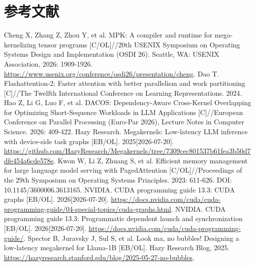 \section*{参考文献}
{\sloppy\small\linespread{1.35}\selectfont
\begin{list}{}{\setlength{\leftmargin}{2em}\setlength{\itemindent}{-2em}\setlength{\itemsep}{3pt}\setlength{\parsep}{0pt}}
 Cheng X, Zhang Z, Zhou Y, et al. MPK: A compiler and runtime for mega-kernelizing tensor programs [C/OL]//20th USENIX Symposium on Operating Systems Design and Implementation (OSDI 26). Seattle, WA: USENIX Association, 2026: 1909-1926. \url{https://www.usenix.org/conference/osdi26/presentation/cheng}.
 Dao T. Flashattention-2: Faster attention with better parallelism and work partitioning [C]//The Twelfth International Conference on Learning Representations. 2024.
 Hao Z, Li G, Luo F, et al. DACOS: Dependency-Aware Cross-Kernel Overlapping for Optimizing Short-Sequence Workloads in LLM Applications [C]//European Conference on Parallel Processing (Euro-Par 2026), Lecture Notes in Computer Science. 2026: 409-422.
 Hazy Research. Megakernels: Low-latency LLM inference with device-side task graphs [EB/OL]. 2025[2026-07-20]. \url{https://github.com/HazyResearch/Megakernels/tree/7309cec801537b61fea3b50d7dfe454a6cde578e}.
 Kwon W, Li Z, Zhuang S, et al. Efficient memory management for large language model serving with PagedAttention [C/OL]//Proceedings of the 29th Symposium on Operating Systems Principles. 2023: 611-626. DOI: 10.1145/3600006.3613165.
 NVIDIA. CUDA programming guide 13.3: CUDA graphs [EB/OL]. 2026[2026-07-20]. \url{https://docs.nvidia.com/cuda/cuda-programming-guide/04-special-topics/cuda-graphs.html}.
 NVIDIA. CUDA programming guide 13.3: Programmatic dependent launch and synchronization [EB/OL]. 2026[2026-07-20]. \url{https://docs.nvidia.com/cuda/cuda-programming-guide/}.
 Spector B, Juravsky J, Sul S, et al. Look ma, no bubbles! Designing a low-latency megakernel for Llama-1B [EB/OL]. Hazy Research Blog, 2025. \url{https://hazyresearch.stanford.edu/blog/2025-05-27-no-bubbles}.
\end{list}\par}
\clearpage
